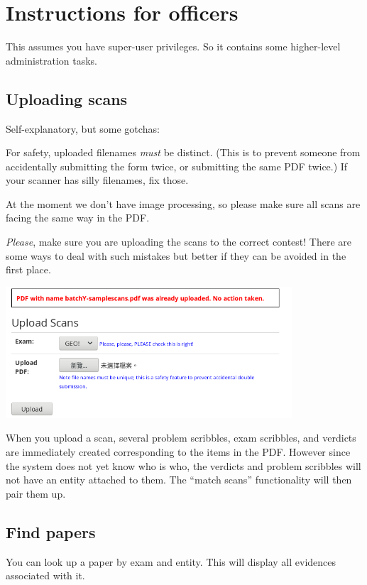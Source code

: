 \chapter{Instructions for officers}
This assumes you have super-user privileges.
So it contains some higher-level administration tasks.

\section{Uploading scans}
Self-explanatory, but some gotchas:
\begin{itemize}
	\ii For safety, uploaded filenames \emph{must} be distinct.
	(This is to prevent someone from accidentally submitting the form twice,
	or submitting the same PDF twice.)
	If your scanner has silly filenames, fix those.

	\ii At the moment we don't have image processing,
	so please make sure all scans are facing the same way in the PDF.

	\ii \emph{Please}, make sure you are uploading the scans
	to the correct contest!
	There are some ways to deal with such mistakes but better
	if they can be avoided in the first place.
\end{itemize}

\begin{center}
	\includegraphics[width=0.8\textwidth]{images/batchscan.png}
\end{center}

When you upload a scan,
several problem scribbles, exam scribbles, and verdicts
are immediately created corresponding to the items in the PDF.
However since the system does not yet know who is who,
the verdicts and problem scribbles will not have an entity attached to them.
The ``match scans'' functionality will then pair them up.

\section{Find papers}
You can look up a paper by exam and entity.
This will display all evidences associated with it.

